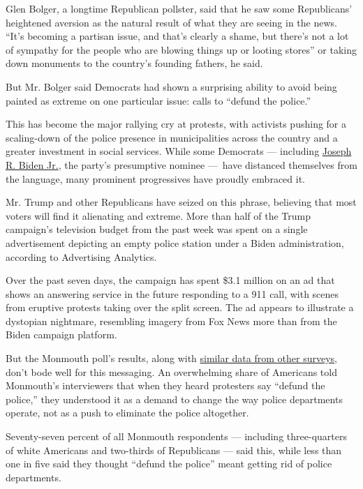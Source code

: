 Glen Bolger, a longtime Republican pollster, said that he saw some
Republicans' heightened aversion as the natural result of what they are
seeing in the news. ``It's becoming a partisan issue, and that's clearly
a shame, but there's not a lot of sympathy for the people who are
blowing things up or looting stores'' or taking down monuments to the
country's founding fathers, he said.

But Mr. Bolger said Democrats had shown a surprising ability to avoid
being painted as extreme on one particular issue: calls to ``defund the
police.''

This has become the major rallying cry at protests, with activists
pushing for a scaling-down of the police presence in municipalities
across the country and a greater investment in social services. While
some Democrats --- including
\href{https://www.nytimes.com/interactive/2020/us/elections/joe-biden.html}{Joseph
R. Biden Jr.}, the party's presumptive nominee ---~have distanced
themselves from the language, many prominent progressives have proudly
embraced it.

Mr. Trump and other Republicans have seized on this phrase, believing
that most voters will find it alienating and extreme. More than half of
the Trump campaign's television budget from the past week was spent on a
single advertisement depicting an empty police station under a Biden
administration, according to Advertising Analytics.

Over the past seven days, the campaign has spent \$3.1 million on an ad
that shows an answering service in the future responding to a 911 call,
with scenes from eruptive protests taking over the split screen. The ad
appears to illustrate a dystopian nightmare, resembling imagery from Fox
News more than from the Biden campaign platform.

But the Monmouth poll's results, along with
\href{https://www.nytimes.com/2020/07/03/us/politics/polling-defund-the-police.html}{similar
data from other surveys}, don't bode well for this messaging. An
overwhelming share of Americans told Monmouth's interviewers that when
they heard protesters say ``defund the police,'' they understood it as a
demand to change the way police departments operate, not as a push to
eliminate the police altogether.

Seventy-seven percent of all Monmouth respondents --- including
three-quarters of white Americans and two-thirds of Republicans --- said
this, while less than one in five said they thought ``defund the
police'' meant getting rid of police departments.

